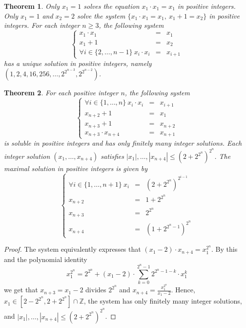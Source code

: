 \documentclass[conference]{IEEEtran}
\newtheorem{theorem}{Theorem}
\begin{document}
\begin{theorem}\label{the1}
Only \mbox{$x_1=1$} solves the equation \mbox{$x_1 \cdot x_1=x_1$} in positive integers.
Only \mbox{$x_1=1$} and \mbox{$x_2=2$} solve the system \mbox{$\{x_1 \cdot x_1=x_1,~x_1+1=x_2\}$}
in positive integers. For each integer \mbox{$n \geqslant 3$}, the following system
\begin{displaymath}
\left\{
\begin{array}{rcl}
x_1 \cdot x_1 &=& x_1 \\
x_1+1 &=& x_2 \\
\forall i \in \{2,\ldots,n-1\} ~x_i \cdot x_i &=& x_{i+1}
\end{array}
\right.
\end{displaymath}
\noindent
has a unique solution in positive integers, namely\\
$\left(1,2,4,16,256,\ldots,2^{\textstyle 2^{n-3}},2^{\textstyle 2^{n-2}}\right)$.
\end{theorem}
\begin{theorem}\label{the2}
For each positive integer $n$, the following system
\[
\left\{\begin{array}{rcl}
\forall i \in \{1,\ldots,n\} ~x_i \cdot x_i &=& x_{i+1} \\
x_{n+2}+1 &=& x_1 \\
x_{n+3}+1 &=& x_{n+2} \\
x_{n+3} \cdot x_{n+4} &=& x_{n+1}
\end{array}\right.
\]
is soluble in positive integers and has only finitely many integer solutions.
Each integer solution \mbox{$(x_1,\ldots,x_{n+4})$} satisfies
\mbox{$|x_1|,\ldots,|x_{n+4}| \leqslant \left(2+2^{\textstyle 2^n}\right)^{\textstyle 2^n}$}.
The maximal solution in positive integers is given by
\begin{displaymath}
\left\{\begin{array}{rcl}
\forall i \in \{1,\ldots,n+1\} ~x_i &=& \left(2+2^{\textstyle 2^n}\right)^{\textstyle 2^{i-1}} \\
x_{n+2} &=& 1+2^{\textstyle 2^n} \\
x_{n+3} &=& 2^{\textstyle 2^n} \\
x_{n+4} &=& \left(1+2^{\textstyle 2^n-1}\right)^{\textstyle 2^n}
\end{array}\right.
\end{displaymath}
\end{theorem}
\begin{proof}
The system equivalently expresses that
$(x_1-2) \cdot x_{n+4}=x_1^{\textstyle 2^n}$.
By this and the polynomial identity
\[
x_1^{\textstyle 2^n}=2^{\textstyle 2^n}+(x_1-2) \cdot \sum_{\textstyle k=0}^{\textstyle 2^n-1} 2^{\textstyle 2^n-1-k} \cdot x_1^k
\]
we get that \mbox{$x_{n+3}=x_1-2$} divides $2^{\textstyle 2^n}$ and
\mbox{$x_{n+4}=\frac{\textstyle x_1^{\textstyle 2^n}}{\textstyle x_1-2}$}. Hence,
\mbox{$x_1 \in \left[2-2^{\textstyle 2^n},2+2^{\textstyle2^n}\right] \cap {\mathbb Z}$},
the system has only finitely many integer solutions, and
$|x_1|,\ldots,|x_{n+4}| \leqslant \left(2+2^{\textstyle 2^n}\right)^{\textstyle 2^n}$.
\end{proof}
\end{document}
